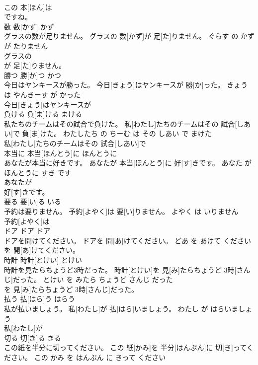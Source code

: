 \documentclass[8pt]{extreport}
\begin{document}
\begin{CJK}{UTF8}{min}
\\	この 本[ほん]は
\\	ですね。			
\\	数	数[かず]	かず	
\\	グラスの数が足りません。	グラスの 数[かず]が 足[た]りません。	ぐらす の かず が たりません	
\\	グラスの
\\	が 足[た]りません。			
\\	勝つ	勝[か]つ	かつ	
\\	今日はヤンキースが勝った。	今日[きょう]はヤンキースが 勝[か]った。	きょう は やんきーす が かった	
\\	今日[きょう]はヤンキースが
\\	負ける	負[ま]ける	まける	
\\	私たちのチームはその試合で負けた。	私[わたし]たちのチームはその 試合[しあい]で 負[ま]けた。	わたしたち の ちーむ は その しあい で まけた	
\\	私[わたし]たちのチームはその 試合[しあい]で
\\	本当に	本当[ほんとう]に	ほんとうに	
\\	あなたが本当に好きです。	あなたが 本当[ほんとう]に 好[す]きです。	あなた が ほんとうに すき です	
\\	あなたが
\\	好[す]きです。			
\\	要る	要[い]る	いる	
\\	予約は要りません。	予約[よやく]は 要[い]りません。	よやく は いりません	
\\	予約[よやく]は
\\	ドア	ドア	ドア	
\\	ドアを開けてください。	ドアを 開[あ]けてください。	どあ を あけて ください	
\\	を 開[あ]けてください。			
\\	時計	時計[とけい]	とけい	
\\	時計を見たらちょうど3時だった。	時計[とけい]を 見[み]たらちょうど 3時[さんじ]だった。	とけい を みたら ちょうど さんじ だった	
\\	を 見[み]たらちょうど 3時[さんじ]だった。			
\\	払う	払[はら]う	はらう	
\\	私が払いましょう。	私[わたし]が 払[はら]いましょう。	わたし が はらいましょう	
\\	私[わたし]が
\\	切る	切[き]る	きる	
\\	この紙を半分に切ってください。	この 紙[かみ]を 半分[はんぶん]に 切[き]ってください。	この かみ を はんぶん に きって ください	

\end{CJK}
\end{document}
